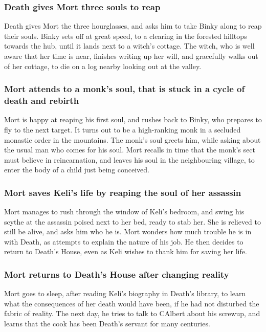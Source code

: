 \subsubsection{\Gls{Death} gives \Gls{Mort} three souls to reap}
\Gls{Death} gives \Gls{Mort} the three hourglasses, and asks him to take \Gls{Binky} along to reap
their souls. \Gls{Binky} sets off at great speed, to a clearing in the forested hilltops towards
the hub, until it lands next to a witch's cottage. The witch, who is well aware that her time is
near, finishes writing up her will, and gracefully walks out of her cottage, to die on a log
nearby looking out at the valley.

\subsubsection{\Gls{Mort} attends to a monk's soul, that is stuck in a cycle of death and rebirth}
\Gls{Mort} is happy at reaping his first soul, and rushes back to \Gls{Binky}, who prepares to
fly to the next target. It turns out to be a high-ranking monk in a secluded monastic order in
the mountains. The monk's soul greets him, while asking about the usual man who comes for his soul.
\Gls{Mort} recalls in time that the monk's sect must believe in reincarnation, and leaves his soul
in the neighbouring village, to enter the body of a child just being conceived.

\subsubsection{\Gls{Mort} saves \Gls{Keli}'s life by reaping the soul of her assassin}
\Gls{Mort} manages to rush through the window of \Gls{Keli}'s bedroom, and swing his scythe at the
assassin poised next to her bed, ready to stab her. She is relieved to still be alive, and asks
him who he is. \Gls{Mort} wonders how much trouble he is in with \Gls{Death}, as attempts to explain
the nature of his job. He then decides to return to \Gls{Death}'s House, even as \Gls{Keli} wishes
to thank him for saving her life.

\subsubsection{\Gls{Mort} returns to \Gls{Death}'s House after changing reality}
\Gls{Mort} goes to sleep, after reading \Gls{Keli}'s biography in \Gls{Death}'s library, to learn
what the consequences of her death would have been, if he had not disturbed the fabric of reality.
The next day, he tries to talk to \Gls{CAlbert} about his screwup, and learns that the cook has been
\Gls{Death}'s servant for many centuries.

